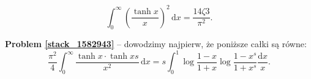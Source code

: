 %

\begin{problem_with_solution}[pytanie 1582943]
    \label{stack_1582943}%
    \begin{equation}
        \int_0^\infty \left(\frac{\tanh x}{x}\right)^2 \,\mathrm{d}x = \frac{14 \zeta 3}{\pi^2}.
    \end{equation}
\end{problem_with_solution}

\textbf{Problem \ref{stack_1582943}} -- dowodzimy najpierw, że poniższe całki są równe:
\begin{equation}
    \frac{\pi^2}{4} \int_0^\infty \frac{\tanh x \cdot \tanh xs}{x^2} \,\mathrm{d}x = s \int_0^1 \log \frac{1-x}{1+x} \log \frac{1-x^s}{1+x^s} \frac{\mathrm{d}x}{x}.
\end{equation}

%